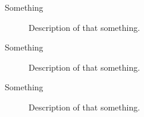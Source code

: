 %
%






\ifoddmakenewpage %


\dominitoc[c] %





%
%

\acknowledgements{
\begin{itemize}
\item 
\item 
\item 
\end{itemize}
}




\ifoddmakenewpage %




\tableofcontents




%
%


\Glossary %


\begin{description}
\item[Something] Description of that something.
\item[Something] Description of that something.
\item[Something] Description of that something.
\end{description}










